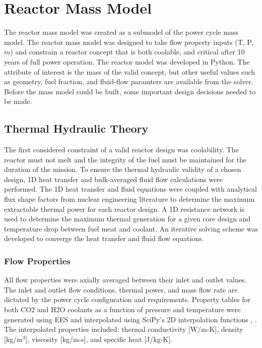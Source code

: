 \chapter{Reactor Mass Model} \label{ch:mass_model}
The reactor mass model was created as a submodel of the power cycle mass
model. The reactor mass model was designed to take flow property inputs (T, P,
$\dot{m}$) and constrain a reactor concept that is both coolable, and critical
after 10 years of full power operation. The reactor model was developed in
Python. The attribute of interest is the mass of
the valid concept, but other useful values such as geometry, fuel fraction,
and fluid-flow paramters are available from the solver. Before the mass model
could be built, some important design decisions needed to be made.


\section{Thermal Hydraulic Theory}
    The first considered constraint of a valid reactor design was coolability. The reactor must
not melt and the integrity of the fuel must be maintained for the duration of
the mission. To ensure the thermal hydraulic validity of a chosen design, 
    1D heat transfer and bulk-averaged fluid flow calculations were performed. The 1D
heat transfer and fluid equations were coupled with analytical flux shape
factors from nuclear engineering literature to determine the maximum extractable
thermal power for each reactor design. A 1D resistance network is used to
determine the maximum thermal generation for a given core design and temperature
drop between fuel meat and coolant. An iterative solving scheme was developed to
converge the heat transfer and fluid flow equations.

\subsection{Flow Properties}
All flow properties were axially averaged between their inlet and outlet values.
The inlet and outlet flow conditions, thermal power, and mass flow rate are
dictated by the power cycle configuration and requirements. Property tables for
both CO2 and H2O coolants as a function of pressure and temperature were 
generated using EES and interpolated using SciPy's 2D interpolation functions
\citep{scipy}, \citep{EES_citation}.
The interpolated properties included: thermal conductivity [W/m-K], density
[kg/m$^3$], viscosity [kg/m-s], and specific heat [J/kg-K].

